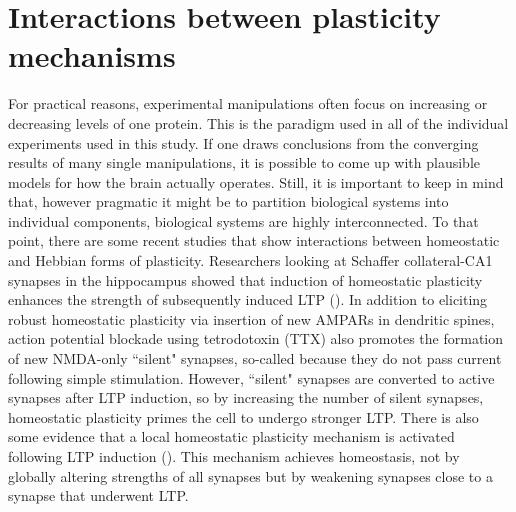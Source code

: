 \section{Interactions between plasticity mechanisms}
For practical reasons, experimental manipulations often focus on increasing or decreasing levels of one protein. This is the paradigm used in all of the individual experiments used in this study. If one draws conclusions from the converging results of many single manipulations, it is possible to come up with plausible models for how the brain actually operates. Still, it is important to keep in mind that, however pragmatic it might be to partition biological systems into individual components, biological systems are highly interconnected. To that point, there are some recent studies that show interactions between homeostatic and Hebbian forms of plasticity. Researchers looking at Schaffer collateral-CA1 synapses in the hippocampus showed that induction of homeostatic plasticity enhances the strength of subsequently induced LTP (\cite{Arendt2013}). In addition to eliciting robust homeostatic plasticity via insertion of new AMPARs in dendritic spines, action potential blockade using tetrodotoxin (TTX) also promotes the formation of new NMDA-only ``silent" synapses, so-called because they do not pass current following simple stimulation. However, ``silent" synapses are converted to active synapses after LTP induction, so by increasing the number of silent synapses, homeostatic plasticity primes the cell to undergo stronger LTP. There is also some evidence that a local homeostatic plasticity mechanism is activated following LTP induction (\cite{Rabinowitch2008}). This mechanism achieves homeostasis, not by globally altering strengths of all synapses but by weakening synapses close to a synapse that underwent LTP.

